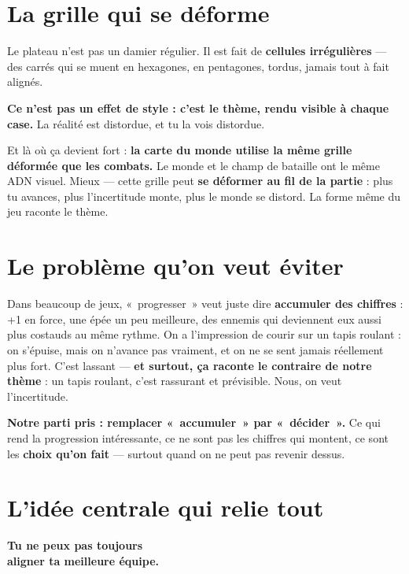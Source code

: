 \documentclass[11pt,a4paper]{article}
\begin{document}
\section{La grille qui se déforme}
Le plateau n'est pas un damier régulier. Il est fait de \textbf{cellules irrégulières} --- des carrés qui se muent en hexagones, en pentagones, tordus, jamais tout à fait alignés.

\smallskip
\textbf{Ce n'est pas un effet de style : c'est le thème, rendu visible à chaque case.} La réalité est distordue, et tu la vois distordue.

\smallskip
Et là où ça devient fort : \textbf{la carte du monde utilise la même grille déformée que les combats.} Le monde et le champ de bataille ont le même ADN visuel. Mieux --- cette grille peut \textbf{se déformer au fil de la partie} : plus tu avances, plus l'incertitude monte, plus le monde se distord. La forme même du jeu raconte le thème.

\section{Le problème qu'on veut éviter}
Dans beaucoup de jeux, «~progresser~» veut juste dire \textbf{accumuler des chiffres} : +1 en force, une épée un peu meilleure, des ennemis qui deviennent eux aussi plus costauds au même rythme. On a l'impression de courir sur un tapis roulant : on s'épuise, mais on n'avance pas vraiment, et on ne se sent jamais réellement plus fort. C'est lassant --- \textbf{et surtout, ça raconte le contraire de notre thème} : un tapis roulant, c'est rassurant et prévisible. Nous, on veut l'incertitude.

\smallskip
\textbf{Notre parti pris : remplacer «~accumuler~» par «~décider~».} Ce qui rend la progression intéressante, ce ne sont pas les chiffres qui montent, ce sont les \textbf{choix qu'on fait} --- surtout quand on ne peut pas revenir dessus.

\section{L'idée centrale qui relie tout}
\begin{coeur}
\centering\large\textbf{\color{ink}Tu ne peux pas toujours\\ aligner ta meilleure équipe.}
\end{coeur}
\end{document}
